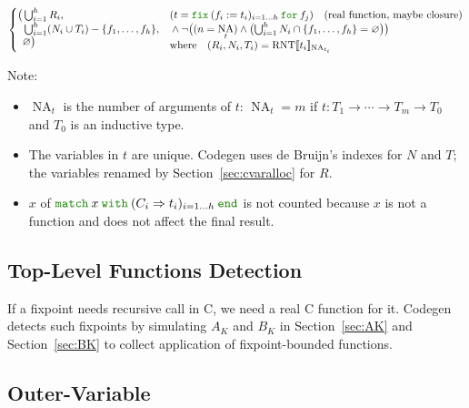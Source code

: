 \documentclass[a4paper,fleqn]{article}
\def\codegen{\textrm{Codegen}}
\newcommand{\kwmatch}{\mbox{\color{mygreen}\ttfamily match}}
\newcommand{\kwwith}{\mbox{\color{mygreen}\ttfamily with}}
\newcommand{\kwend}{\mbox{\color{mygreen}\ttfamily end}}
\newcommand{\kwfix}{\mbox{\color{mygreen}\ttfamily fix}}
\newcommand{\kwfor}{\mbox{\color{mygreen}\ttfamily for}}
\newcommand{\match}[4]{\kwmatch\:#1\:\kwwith\:(#2 \Rightarrow #3)_{#4}\:\kwend}
\newcommand{\fix}[4]{\kwfix\:(#1 := #2)_{#3}\:\kwfor\:#4}
\DeclareMathOperator{\NA}{NA} %
\newcommand{\BRA}[1]{\llbracket #1 \rrbracket}
\DeclareMathOperator{\RNTop}{RNT}
\newcommand{\RNT}[2]{\RNTop\BRA{#1}_{#2}}
\newcommand{\secref}[1]{Section~\ref{#1}}
\begin{document}
\begin{align*}
\begin{cases}
    \begin{aligned}[t]
      \bigl( & \textstyle\bigcup_{i=1}^h R_i, \\
             & \textstyle\bigcup_{i=1}^h (N_i \cup T_i) - \{f_1,\dotsc, f_h\}, \\
             & \varnothing \bigr)
    \end{aligned} &
      \begin{aligned}[t]
        & (t = \fix{f_i}{t_i}{i=1\ldots h}{f_j}) \quad \text{(real function, maybe closure)} \\
        & {} \wedge \neg \bigl((n = \NA_t) \wedge \bigl(\textstyle\bigcup_{i=1}^h N_i \cap \{f_1,\dotsc, f_h\} = \varnothing\bigr)\bigr) \\
        & \text{where}\quad (R_i, N_i, T_i) = \RNT{t_i}{\NA_{t_i}}
      \end{aligned}
  \end{cases}
\end{align*}
{\small Note:
\begin{itemize}
  \item $\NA_t$ is the number of arguments of $t$: \quad $\NA_t=m$ if $t : T_1 \rightarrow \dotsb \rightarrow T_m \rightarrow T_0$ and $T_0$ is an inductive type.
  \item The variables in $t$ are unique.
    \codegen{} uses de Bruijn's indexes for $N$ and $T$;
    the variables renamed by \secref{sec:cvaralloc} for $R$.
  \item $x$ of $\match{x}{C_i}{t_i}{i=1\ldots h}$ is not counted because $x$ is not a function and does not affect the final result.
\end{itemize}}

\subsection{Top-Level Functions Detection}\label{sec:top-level-function-detection}
If a fixpoint needs recursive call in C, we need a real C function for it.
\codegen{} detects such fixpoints by simulating $A_K$ and $B_K$ in \secref{sec:AK} and \secref{sec:BK} to collect application of fixpoint-bounded functions.

\subsection{Outer-Variable}\label{sec:outer-variable}
\end{document}

